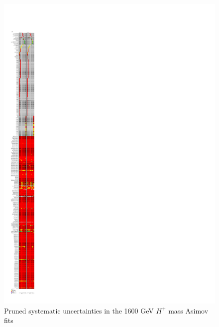 \begin{figure}[H]
  \centering
  \includegraphics[keepaspectratio, scale=0.85]{images/Pruning/Pruning_Asimov_Hp1600_Contained80_DL1r_70.pdf}
  \caption{Pruned systematic uncertainties in the 1600 GeV $H^{+}$ mass Asimov fits}
  \label{fig:Pruning_Asimov_Hp1600_Contained80_DL1r_70}
\end{figure}

